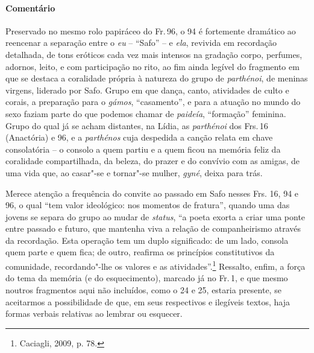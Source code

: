 {\paragraph{Comentário} Preservado no mesmo rolo papiráceo do Fr.\,96, o 94 é fortemente dramático ao
reencenar a separação entre o \textit{eu} -- ``Safo'' -- e \textit{ela}, revivida em
recordação detalhada, de tons eróticos cada vez mais intensos na
gradação corpo, perfumes, adornos, leito, e com participação no rito,
ao fim ainda legível do fragmento em que se destaca a coralidade própria à natureza do grupo de \textit{parthénoi}, de meninas virgens, liderado por Safo. Grupo em que dança, canto, atividades de culto e corais, a preparação para o \textit{gámos}, ``casamento'', e para a atuação no mundo do sexo faziam parte do que podemos chamar de \textit{paideía}, ``formação'' feminina. Grupo do qual já se acham distantes, na Lídia, as \textit{parthénoi} dos Frs.\,16 (Anactória) e 96, e a \textit{parthénos} cuja despedida a canção relata em chave consolatória -- o consolo a quem partiu e a quem ficou na memória feliz da coralidade compartilhada, da beleza, do prazer e do convívio com as amigas, de uma vida que, ao casar"-se e tornar"-se mulher, \textit{gyné}, deixa para trás.

Merece atenção a frequência do convite ao passado em Safo nesses Frs. 16, 94 e 96, o qual ``tem valor ideológico: nos momentos de fratura'', quando uma das jovens se separa do grupo ao mudar de \textit{status}, ``a poeta exorta a criar uma ponte entre passado e futuro, que mantenha viva a relação de companheirismo através da recordação. Esta operação tem um duplo significado: de um lado, consola quem parte e quem fica; de outro, reafirma os princípios constitutivos da comunidade, recordando"-lhe os valores e as atividades''.\footnote{Caciagli, 2009, p. 78.}
Ressalto, enfim, a força do tema da memória (e do esquecimento), marcado já no Fr.\,1, e que mesmo noutros fragmentos aqui não incluídos, como o 24 e 25, estaria presente, se aceitarmos a possibilidade de que, em seus respectivos e ilegíveis textos, haja formas verbais relativas ao lembrar ou esquecer.
}






